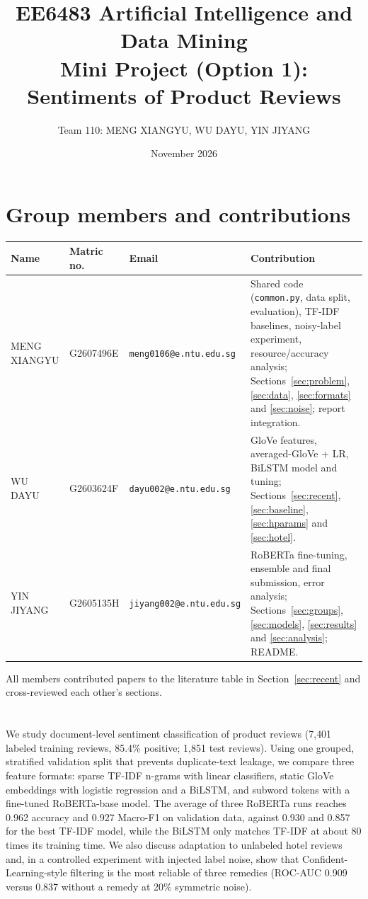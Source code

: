 \documentclass[11pt,a4paper]{article}
\title{EE6483 Artificial Intelligence and Data Mining\\Mini Project (Option 1): Sentiments of Product Reviews}
\author{Team 110: MENG XIANGYU, WU DAYU, YIN JIYANG}
\date{November 2026}
\renewenvironment{abstract}{\section*{\abstractname}}{}
\begin{document}
\vspace*{-1.8cm}
{\let\newpage\relax\maketitle}
\vspace{-0.6cm}

\section*{Group members and contributions}
\begin{table}[h]
\centering
\small
\begin{tabularx}{\textwidth}{l l l Y}
\toprule
Name & Matric no. & Email & Contribution \\
\midrule
MENG XIANGYU & G2607496E & \texttt{\footnotesize meng0106@e.ntu.edu.sg} & Shared code (\texttt{common.py}, data split, evaluation), TF-IDF baselines, noisy-label experiment, resource/accuracy analysis; Sections~\ref{sec:problem}, \ref{sec:data}, \ref{sec:formats} and \ref{sec:noise}; report integration. \\
WU DAYU & G2603624F & \texttt{\footnotesize dayu002@e.ntu.edu.sg} & GloVe features, averaged-GloVe + LR, BiLSTM model and tuning; Sections~\ref{sec:recent}, \ref{sec:baseline}, \ref{sec:hparams} and \ref{sec:hotel}. \\
YIN JIYANG & G2605135H & \texttt{\footnotesize jiyang002@e.ntu.edu.sg} & RoBERTa fine-tuning, ensemble and final submission, error analysis; Sections~\ref{sec:groups}, \ref{sec:models}, \ref{sec:results} and \ref{sec:analysis}; README. \\
\bottomrule
\end{tabularx}
\end{table}
All members contributed papers to the literature table in Section~\ref{sec:recent} and cross-reviewed each other's sections.

\begin{abstract}
We study document-level sentiment classification of product reviews (7{,}401 labeled training reviews, 85.4\% positive; 1{,}851 test reviews).
Using one grouped, stratified validation split that prevents duplicate-text leakage, we compare three feature formats: sparse TF-IDF n-grams with linear classifiers, static GloVe embeddings with logistic regression and a BiLSTM, and subword tokens with a fine-tuned RoBERTa-base model.
The average of three RoBERTa runs reaches 0.962 accuracy and 0.927 Macro-F1 on validation data, against 0.930 and 0.857 for the best TF-IDF model, while the BiLSTM only matches TF-IDF at about 80 times its training time.
We also discuss adaptation to unlabeled hotel reviews and, in a controlled experiment with injected label noise, show that Confident-Learning-style filtering is the most reliable of three remedies (ROC-AUC 0.909 versus 0.837 without a remedy at 20\% symmetric noise).
\end{abstract}
\end{document}
